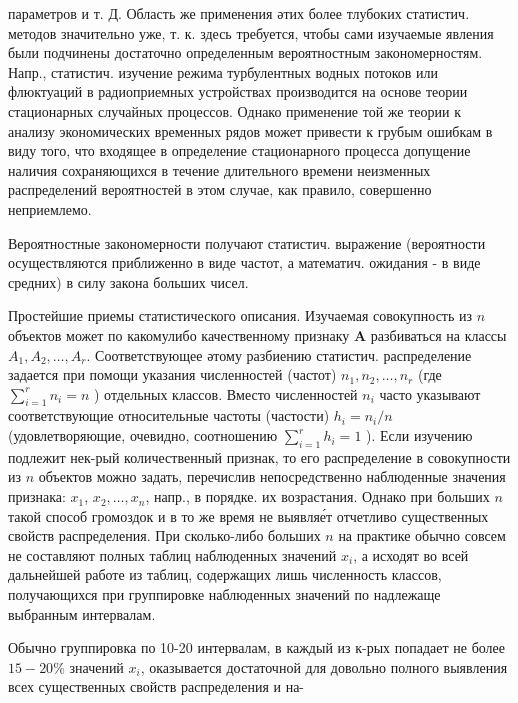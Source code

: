 \documentclass[10pt]{article}
\begin{document}
параметров и т. Д. Область же применения әтих более тлубоких статистич. методов значительно уже, т. к. здесь требуется, чтобы сами изучаемые явления были подчинены достаточно определенным вероятностным закономерностям. Напр., статистич. изучение режима турбулентных водных потоков или флюктуаций в радиоприемных устройствах производится на основе теории стационарных случайных процессов. Однако применение той же теории к анализу экономических временных рядов может привести к грубым ошибкам в виду того, что входящее в определение стационарного процесса допущение наличия сохраняющихся в течение длительного времени неизменных распределений вероятностей в этом случае, как правило, совершенно неприемлемо.



Вероятностные закономерности получают статистич. выражение (вероятности осуществляются приближенно в виде частот, а математич. ожидания - в виде средних) в силу закона больших чисел.



Простейшие приемы статистического описания. Изучаемая совокупность из $n$ объектов может по какомулибо качественному признаку $\boldsymbol{A}$ разбиваться на классы $A_{1}, A_{2}, \ldots, A_{r}$. Соответствующее әтому разбиению статистич. распределение задается при помощи указания численностей (частот) $n_{1}, n_{2}, \ldots, n_{r}$ (где $\sum_{i=1}^{r} n_{i}=n$ ) отдельных классов. Вместо численностей $n_{i}$ часто указывают соответствующие относительные частоты (частости) $h_{i}=n_{i} / n$ (удовлетворяющие, очевидно, соотношению $\sum_{i=1}^{r} h_{i}=1$ ). Если изучению подлежит нек-рый количественный признак, то его распределение в совокупности из $n$ объектов можно задать, перечислив непосредственно наблюденные значения признака: $x_{1}$, $x_{2}, \ldots, x_{n}$, напр., в порядке. их возрастания. Однако при больших $n$ такой способ громоздок и в то же время не выявляе́т отчетливо существенных свойств распределения. При сколько-либо больших $n$ на практике обычно совсем не составляют полных таблиц наблюденных значений $x_{i}$, а исходят во всей дальнейшей работе из таблиц, содержащих лишь численность классов, получающихся при группировке наблюденных значений по надлежаще выбранным интервалам.



Обычно группировка по 10-20 интервалам, в каждый из к-рых попадает не более $15-20 \%$ значений $x_{i}$, оказывается достаточной для довольно полного выявления всех существенных свойств распределения и на-
\end{document}
